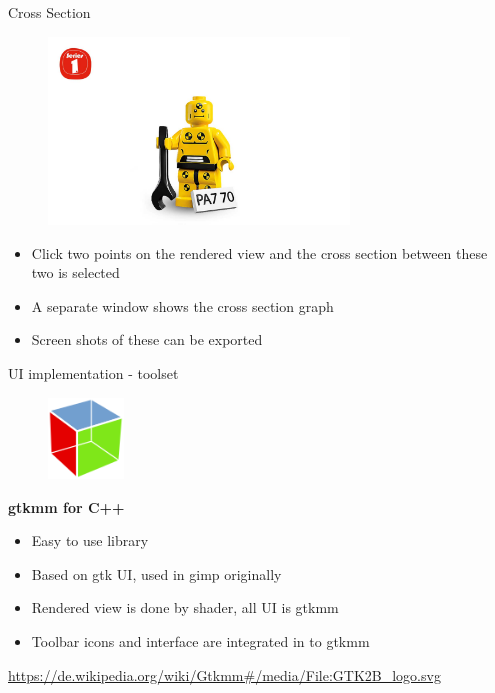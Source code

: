 \documentclass[shortpres,usenames,dvipsnames]{beamer}
\begin{document}
\begin{frame}[fragile]{Cross Section}
	\begin{figure}
		\includegraphics[clip, width=80mm]{img/dummy_image.jpg}
	\end{figure}
	\begin{itemize}
		\item Click two points on the rendered view and the cross section between these two is selected
		\item A separate window shows the cross section graph
		\item Screen shots of these can be exported
	\end{itemize}
\end{frame}

\begin{frame}[fragile]{UI implementation - toolset}
	\begin{figure}
		\includegraphics[clip, width=20mm]{img/GTK_logo.png}
	\end{figure}
	\textbf{gtkmm for C++}
	\begin{itemize}
		\item Easy to use library 
		\item Based on gtk UI, used in gimp originally
		\item Rendered view is done by shader, all UI is gtkmm
		\item Toolbar icons and interface are integrated in to gtkmm 
	\end{itemize}
	\vfill
	\flushleft
	{\fontsize{5}{5} \selectfont \url{https://de.wikipedia.org/wiki/Gtkmm#/media/File:GTK2B_logo.svg}}
\end{frame}
	
\end{document}
